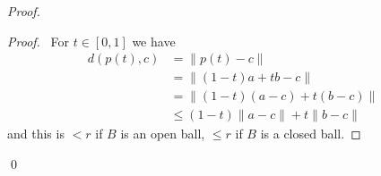 \begin{proof}
  \pf
  \begin{proof}
    \pf\ For $t \in [0,1]$ we have
    \begin{align*}
      d(p(t), c) & = \| p(t) - c \| \\
      & = \| (1-t)a + tb - c \| \\
      & = \| (1-t)(a-c) + t(b-c) \| \\
      & \leq (1-t) \| a-c \| + t \| b-c \|
    \end{align*}
    and this is $<r$ if $B$ is an open ball, $\leq r$ if $B$ is a closed ball.
  \end{proof}
  \qed
\end{proof}

